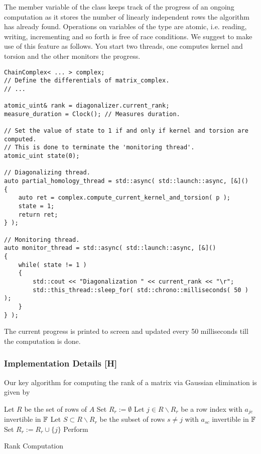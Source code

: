 The member variable  of the class  keeps track of the progress of an ongoing computation as
it stores the number of linearly independent rows the algorithm has already found.
Operations on variables of the type  are atomic, i.e. reading, writing, incrementing and so forth is free of race conditions.
We suggest to make use of this feature as follows.
You start two threads, one computes kernel and torsion and the other monitors the progress.
\begin{lstlisting}
ChainComplex< ... > complex;
// Define the differentials of matrix_complex.
// ...

atomic_uint& rank = diagonalizer.current_rank;
measure_duration = Clock(); // Measures duration.

// Set the value of state to 1 if and only if kernel and torsion are computed.
// This is done to terminate the 'monitoring thread'.
atomic_uint state(0);

// Diagonalizing thread.
auto partial_homology_thread = std::async( std::launch::async, [&]()
{
    auto ret = complex.compute_current_kernel_and_torsion( p );
    state = 1;
    return ret;
} );

// Monitoring thread.
auto monitor_thread = std::async( std::launch::async, [&]()
{
    while( state != 1 )
    {
        std::cout << "Diagonalization " << current_rank << "\r";
        std::this_thread::sleep_for( std::chrono::milliseconds( 50 ) );
    }
} );
\end{lstlisting}
The current progress is printed to screen and updated every 50 milliseconds till the computation is done.

\subsubsection{Implementation Details [H]}
\label{diag_field_implementation}
Our key algorithm for computing the rank of a matrix via Gaussian elimination is given by

\begin{algorithm}[H]
\label{rank}
\DontPrintSemicolon
{}

Let $R$ be the set of rows of $A$\;
Set $R_r := \emptyset$ \;
{
	Let $j \in R \backslash R_r$ be a row index with $a_{jc}$ invertible in $\mathbb F$\;
	{
		\KwCont\;
	}
	Let $S \subset R \backslash R_r$ be the subset of rows $s \neq j$ with $a_{sc}$ invertible in $\mathbb F$\;
	{
		Set $R_r := R_r \cup \{j\}$\;
	}
	{
		Perform \;
	}
}

\caption{Rank Computation}

\end{algorithm}

